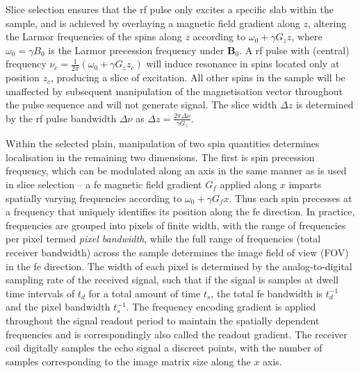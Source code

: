Slice selection ensures that the \gls{rf} pulse only excites a specific slab within the sample, and is achieved by overlaying a magnetic field gradient along $z$, altering the Larmor frequencies of the spins along $z$ according to $\omega_0 + \gamma G_zz$, where $\omega_0 = \gamma B_0$ is the Larmor precession frequency under $\mathbf{B}_0$.
A \gls{rf} pulse with (central) frequency $\nu_c = \frac{1}{2\pi} (\omega_0 + \gamma G_z z_c)$ will induce resonance in spins located only at position $z_c$, producing a slice of excitation. %
All other spins in the sample will be unaffected by subsequent manipulation of the magnetisation vector throughout the pulse sequence and will not generate signal.
The slice width $\Delta z$ is determined by the \gls{rf} pulse bandwidth $\Delta\nu$ as $\Delta z = \frac{2 \pi \Delta \nu}{\gamma G_z}$.

Within the selected plain, manipulation of two spin quantities determines localisation in the remaining two dimensions.
The first is spin precession frequency, which can be modulated along an axis in the same manner as is used in slice selection -- a \gls{fe} magnetic field gradient $G_{f}$ applied along $x$ imparts spatially varying frequencies according to $\omega_0 + \gamma G_{f}x$.
Thus each spin precesses at a frequency that uniquely identifies its position along the \gls{fe} direction.
In practice, frequencies are grouped into pixels of finite width, with the range of frequencies per pixel termed \textit{pixel bandwidth}, while the full range of frequencies (total receiver bandwidth) across the sample determines the image field of view (FOV) in the \gls{fe} direction.
The width of each pixel is determined by the analog-to-digital sampling rate of the received signal, such that if the signal is samples at dwell time intervals of $t_d$ for a total amount of time $t_s$, the total \gls{fe} bandwidth is $t_d^{-1}$ and the pixel bandwidth $t_s^{-1}$.
The frequency encoding gradient is applied throughout the signal readout period to maintain the spatially dependent frequencies and is correspondingly also called the readout gradient.
The receiver coil digitally samples the echo signal a discreet points, with the number of samples corresponding to the image matrix size along the $x$ axis.

